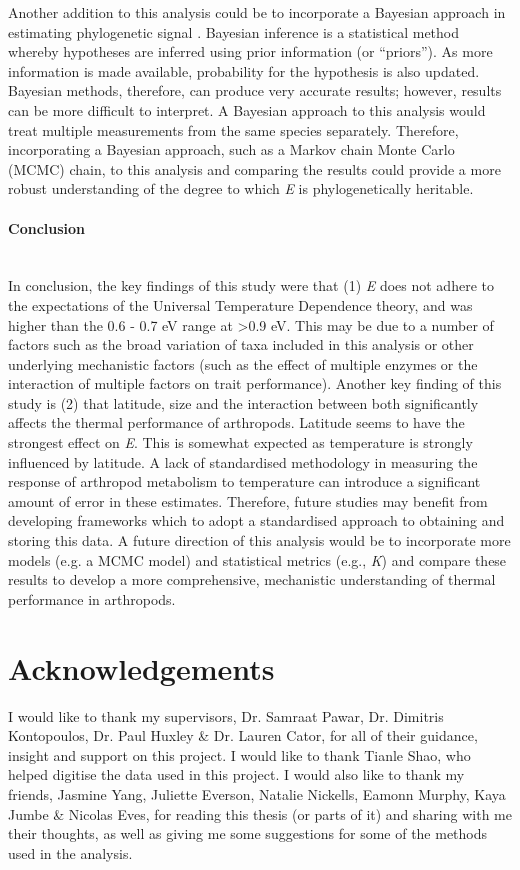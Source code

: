 \documentclass[11pt]{article}
\begin{document}
\begin{flushleft}
Another addition to this analysis could be to incorporate a Bayesian approach in estimating phylogenetic signal \citep{vrancken2015simultaneously,kontopoulos2020adaptive}. Bayesian inference is a statistical method whereby hypotheses are inferred using prior information (or “priors”). As more information is made available, probability for the hypothesis is also updated. Bayesian methods, therefore, can produce very accurate results; however, results can be more difficult to interpret. A Bayesian approach to this analysis would treat multiple measurements from the same species separately. Therefore, incorporating a Bayesian approach, such as a Markov chain Monte Carlo (MCMC) chain, to this analysis and comparing the results could provide a more robust understanding of the degree to which \emph{E} is phylogenetically heritable.  
\linebreak

\paragraph{Conclusion}\mbox{}\\
In conclusion, the key findings of this study were that (1) \emph{E} does not adhere to the expectations of the Universal Temperature Dependence theory, and was higher than the 0.6 - 0.7 eV range at >0.9 eV. This may be due to a number of factors such as the broad variation of taxa included in this analysis or other underlying mechanistic factors (such as the effect of multiple enzymes or the interaction of multiple factors on trait performance). Another key finding of this study is (2) that latitude, size and the interaction between both significantly affects the thermal performance of arthropods. Latitude seems to have the strongest effect on \emph{E}. This is somewhat expected as temperature is strongly influenced by latitude. A lack of standardised methodology in measuring the response of arthropod metabolism to temperature can introduce a significant amount of error in these estimates. Therefore, future studies may benefit from developing frameworks which to adopt a standardised approach to obtaining and storing this data. A future direction of this analysis would be to incorporate more models (e.g. a MCMC model) and statistical metrics (e.g., \emph{K}) and compare these results to develop a more comprehensive, mechanistic understanding of thermal performance in arthropods.  
\clearpage

\section{Acknowledgements}
I would like to thank my supervisors, Dr. Samraat Pawar, Dr. Dimitris Kontopoulos, Dr. Paul Huxley \&  Dr. Lauren Cator, for all of their guidance, insight and support on this project. I would like to thank Tianle Shao, who helped digitise the data used in this project. I would also like to thank my friends, Jasmine Yang, Juliette Everson, Natalie Nickells, Eamonn Murphy, Kaya Jumbe \& Nicolas Eves, for reading this thesis (or parts of it) and sharing with me their thoughts, as well as giving me some suggestions for some of the methods used in the analysis. 
\newpage

\end{flushleft}
\end{document}
